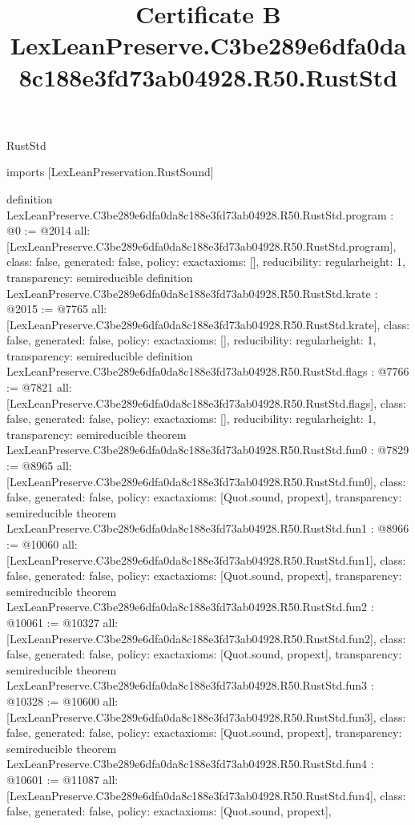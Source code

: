 \begin{lexlean}{RustStd}
\title{Certificate B LexLeanPreserve.C3be289e6dfa0da8c188e3fd73ab04928.R50.RustStd}
\begin{coremodule}
imports [LexLeanPreservation.RustSound]

definition LexLeanPreserve.C3be289e6dfa0da8c188e3fd73ab04928.R50.RustStd.program : @0 := @2014 {
  all: [LexLeanPreserve.C3be289e6dfa0da8c188e3fd73ab04928.R50.RustStd.program],
  class: false,
  generated: false,
  policy: exact{axioms: []},
  reducibility: regular{height: 1},
  transparency: semireducible
}
definition LexLeanPreserve.C3be289e6dfa0da8c188e3fd73ab04928.R50.RustStd.krate : @2015 := @7765 {
  all: [LexLeanPreserve.C3be289e6dfa0da8c188e3fd73ab04928.R50.RustStd.krate],
  class: false,
  generated: false,
  policy: exact{axioms: []},
  reducibility: regular{height: 1},
  transparency: semireducible
}
definition LexLeanPreserve.C3be289e6dfa0da8c188e3fd73ab04928.R50.RustStd.flags : @7766 := @7821 {
  all: [LexLeanPreserve.C3be289e6dfa0da8c188e3fd73ab04928.R50.RustStd.flags],
  class: false,
  generated: false,
  policy: exact{axioms: []},
  reducibility: regular{height: 1},
  transparency: semireducible
}
theorem LexLeanPreserve.C3be289e6dfa0da8c188e3fd73ab04928.R50.RustStd.fun0 : @7829 := @8965 {
  all: [LexLeanPreserve.C3be289e6dfa0da8c188e3fd73ab04928.R50.RustStd.fun0],
  class: false,
  generated: false,
  policy: exact{axioms: [Quot.sound, propext]},
  transparency: semireducible
}
theorem LexLeanPreserve.C3be289e6dfa0da8c188e3fd73ab04928.R50.RustStd.fun1 : @8966 := @10060 {
  all: [LexLeanPreserve.C3be289e6dfa0da8c188e3fd73ab04928.R50.RustStd.fun1],
  class: false,
  generated: false,
  policy: exact{axioms: [Quot.sound, propext]},
  transparency: semireducible
}
theorem LexLeanPreserve.C3be289e6dfa0da8c188e3fd73ab04928.R50.RustStd.fun2 : @10061 := @10327 {
  all: [LexLeanPreserve.C3be289e6dfa0da8c188e3fd73ab04928.R50.RustStd.fun2],
  class: false,
  generated: false,
  policy: exact{axioms: [Quot.sound, propext]},
  transparency: semireducible
}
theorem LexLeanPreserve.C3be289e6dfa0da8c188e3fd73ab04928.R50.RustStd.fun3 : @10328 := @10600 {
  all: [LexLeanPreserve.C3be289e6dfa0da8c188e3fd73ab04928.R50.RustStd.fun3],
  class: false,
  generated: false,
  policy: exact{axioms: [Quot.sound, propext]},
  transparency: semireducible
}
theorem LexLeanPreserve.C3be289e6dfa0da8c188e3fd73ab04928.R50.RustStd.fun4 : @10601 := @11087 {
  all: [LexLeanPreserve.C3be289e6dfa0da8c188e3fd73ab04928.R50.RustStd.fun4],
  class: false,
  generated: false,
  policy: exact{axioms: [Quot.sound, propext]},
}
\end{coremodule}
\end{lexlean}
